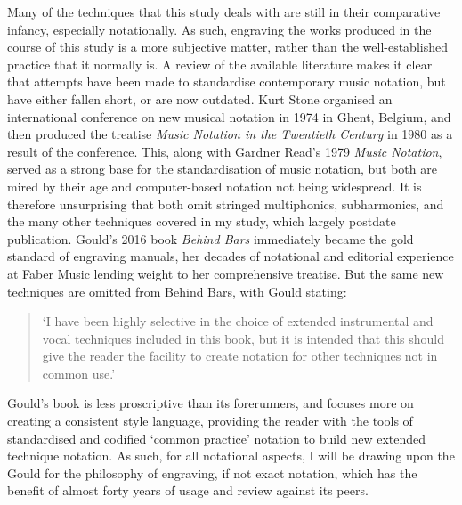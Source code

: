Many of the techniques that this study deals with are still in their comparative infancy, especially notationally. 
As such, engraving the works produced in the course of this study is a more subjective matter, rather than the well-established practice that it normally is. 
A review of the available literature makes it clear that attempts have been made to standardise contemporary music notation, but have either fallen short, or are now outdated. 
Kurt Stone organised an international conference on new musical notation in 1974 in Ghent, Belgium, and then produced the treatise \emph{Music Notation in the Twentieth Century} in 1980 as a result of the conference.\autocite[xiii]{stoneMusicNotationTwentieth1980} 
This, along with Gardner Read’s 1979 \emph{Music Notation}, served as a strong base for the standardisation of music notation, but both are mired by their age and computer-based notation not being widespread.\autocite{readCompendiumModernInstrumental1993} 
It is therefore unsurprising that both omit stringed multiphonics, subharmonics, and the many other techniques covered in my study, which largely postdate publication. 
Gould’s 2016 book \emph{Behind Bars} immediately became the gold standard of engraving manuals, her decades of notational and editorial experience at Faber Music lending weight to her comprehensive treatise.\autocite[]{gouldBars2011} 
But the same new techniques are omitted from Behind Bars, with Gould stating: 
\begin{quotation}
    ‘I have been highly selective in the choice of extended instrumental and vocal techniques included in this book, but it is intended that this should give the reader the facility to create notation for other techniques not in common use.’\autocite[iii]{gouldBars2011} 
\end{quotation}
Gould’s book is less proscriptive than its forerunners, and focuses more on creating a consistent style language, providing the reader with the tools of standardised and codified ‘common practice’ notation to build new extended technique notation. 
As such, for all notational aspects, I will be drawing upon the Gould for the philosophy of engraving, if not exact notation, which has the benefit of almost forty years of usage and review against its peers.

